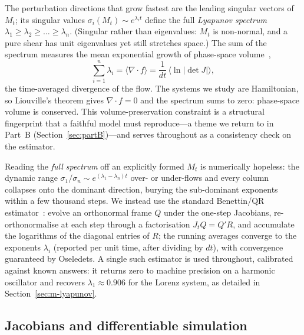 \documentclass[11pt]{article}
\begin{document}
The perturbation directions that grow fastest are the leading singular vectors of $M_t$; its singular values $\sigma_i(M_t)\sim e^{\lambda_i t}$ define the full \emph{Lyapunov spectrum} $\lambda_1\ge\lambda_2\ge\dots\ge\lambda_n$. (Singular rather than eigenvalues: $M_t$ is non-normal, and a pure shear has unit eigenvalues yet still stretches space.) The sum of the spectrum measures the mean exponential growth of phase-space volume~\cite{eckmann1985ergodic},
\begin{equation}
\sum_{i=1}^{n}\lambda_i = \big\langle \nabla\!\cdot f\big\rangle = \frac{1}{dt}\,\big\langle \ln\lvert\det J\rvert\big\rangle,
\label{eq:sum-rule}
\end{equation}
the time-averaged divergence of the flow. The systems we study are Hamiltonian, so Liouville's theorem gives $\nabla\!\cdot f = 0$ and the spectrum sums to zero: phase-space volume is conserved. This volume-preservation constraint is a structural fingerprint that a faithful model must reproduce---a theme we return to in Part~B (Section~\ref{sec:partB})---and serves throughout as a consistency check on the estimator.

Reading the \emph{full spectrum} off an explicitly formed $M_t$ is numerically hopeless: the dynamic range $\sigma_1/\sigma_n\sim e^{(\lambda_1-\lambda_n)t}$ over- or under-flows and every column collapses onto the dominant direction, burying the sub-dominant exponents within a few thousand steps. We instead use the standard Benettin/QR estimator~\cite{benettin1980lyapunov,engelken2023lyapunov}: evolve an orthonormal frame $Q$ under the one-step Jacobians, re-orthonormalise at each step through a factorisation $J_t Q = Q'R$, and accumulate the logarithms of the diagonal entries of $R$; the running averages converge to the exponents $\lambda_i$ (reported per unit time, after dividing by $dt$), with convergence guaranteed by Oseledets. A single such estimator is used throughout, calibrated against known answers: it returns zero to machine precision on a harmonic oscillator and recovers $\lambda_1\approx 0.906$ for the Lorenz system, as detailed in Section~\ref{sec:m-lyapunov}.


\subsection{Jacobians and differentiable simulation}\label{sec:bg-jacobian}
\end{document}
